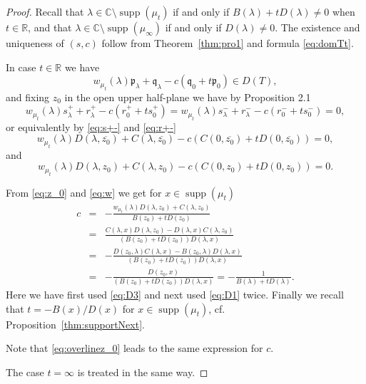 \documentclass [12pt]{article}
\DeclareMathOperator{\supp}{supp}
\newcommand{\C}{\mathbb{C}}
\newcommand{\R}{\mathbb{R}}
\newcommand{\la}{\lambda}
\begin{document}
  \begin{proof} Recall that $\la\in\C\setminus \supp(\mu_t)$ if and only if $B(\la)+tD(\la)\neq 0$ when $t\in\R$, and that $\la\in\C\setminus \supp(\mu_\infty)$ if and only if
 $D(\la)\neq 0$. The existence and uniqueness of $(s,c)$ follow from Theorem~\ref{thm:pro1} and formula \eqref{eq:domTt}.
 
 In case $t\in\R$ we have
 $$
 w_{\mu_t}(\lambda)\mathfrak{p}_\lambda+\mathfrak{q}_\lambda-c(\mathfrak{q}_0+t\mathfrak{p}_0)\in D(T), 
 $$
 and fixing $z_0$ in the open upper half-plane we have by Proposition 2.1
  $$
 w_{\mu_t}(\la)s_\la^{+} +r_\la^{+} - c(r_0^{+}+ts_0^{+})= w_{\mu_t}(\la)s_\la^{-} +r_\la^{-} - c(r_0^{-}+ ts_0^{-})=0,
 $$
 or equivalently by \eqref{eq:s+-} and \eqref{eq:r+-}
\begin{equation}\label{eq:overlinez_0}
 w_{\mu_t}(\la) D(\la,\overline{z_0})+C(\la,\overline{z_0})-c(C(0,\overline{z_0})+tD(0,\overline{z_0}))=0,
\end{equation}
and
\begin{equation}\label{eq:z_0}
 w_{\mu_t}(\la) D(\la,z_0)+C(\la,z_0)-c(C(0,z_0)+tD(0,z_0))=0.
\end{equation}

From \eqref{eq:z_0} and \eqref{eq:w} we get for $x\in\supp(\mu_t)$
\begin{eqnarray*}
c &=& -\frac{w_{\mu_t}(\la) D(\la,z_0)+C(\la,z_0)}{B(z_0)+tD(z_0)}\\
 &=&  \frac{C(\la,x)D(\la,z_0)-D(\la,x)C(\la,z_0)}{(B(z_0)+tD(z_0))D(\la,x)}\\
 &=&-\frac{D(z_0,\la)C(\la,x)-B(z_0,\la)D(\la,x)}{(B(z_0)+tD(z_0))D(\la,x)}\\
 &=&-\frac{D(z_0,x)}{(B(z_0)+tD(z_0))D(\la,x)}=-\frac{1}{B(\la)+tD(\la)}.
  \end{eqnarray*}
 Here we have first used \eqref{eq:D3} and next used \eqref{eq:D1}  twice. Finally we recall that $t=-B(x)/D(x)$ for $x\in\supp(\mu_t)$, cf. Proposition~\ref{thm:supportNext}. 
 
 Note that \eqref{eq:overlinez_0} leads to the same expression for $c$.
 
 The case $t=\infty$ is treated in the same way. 
 \end{proof}
 
  
  
  
  
  
  
\end{document}
